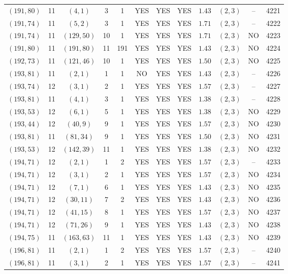 \begin{longtable}{|c|c|c|c|c|c|c|c|c|c|c|c|}
$(191,80)$ & 11 & $(4,1)$ & 3 & 1 & YES & YES & YES & $1.43$ & $(2,3)$ & -- & 4221\\
$(191,74)$ & 11 & $(5,2)$ & 3 & 1 & YES & YES & YES & $1.71$ & $(2,3)$ & -- & 4222\\
$(191,74)$ & 11 & $(129,50)$ & 10 & 1 & YES & YES & YES & $1.71$ & $(2,3)$ & NO & 4223\\
$(191,80)$ & 11 & $(191,80)$ & 11 & 191 & YES & YES & YES & $1.43$ & $(2,3)$ & NO & 4224\\
$(192,73)$ & 11 & $(121,46)$ & 10 & 1 & YES & YES & YES & $1.50$ & $(2,3)$ & NO & 4225\\
$(193,81)$ & 11 & $(2,1)$ & 1 & 1 & NO & YES & YES & $1.43$ & $(2,3)$ & -- & 4226\\
$(193,74)$ & 12 & $(3,1)$ & 2 & 1 & YES & YES & YES & $1.57$ & $(2,3)$ & -- & 4227\\
$(193,81)$ & 11 & $(4,1)$ & 3 & 1 & YES & YES & YES & $1.38$ & $(2,3)$ & -- & 4228\\
$(193,53)$ & 12 & $(6,1)$ & 5 & 1 & YES & YES & YES & $1.38$ & $(2,3)$ & NO & 4229\\
$(193,44)$ & 12 & $(40,9)$ & 9 & 1 & YES & YES & YES & $1.57$ & $(2,3)$ & NO & 4230\\
$(193,81)$ & 11 & $(81,34)$ & 9 & 1 & YES & YES & YES & $1.50$ & $(2,3)$ & NO & 4231\\
$(193,53)$ & 12 & $(142,39)$ & 11 & 1 & YES & YES & YES & $1.38$ & $(2,3)$ & NO & 4232\\
$(194,71)$ & 12 & $(2,1)$ & 1 & 2 & YES & YES & YES & $1.57$ & $(2,3)$ & -- & 4233\\
$(194,71)$ & 12 & $(3,1)$ & 2 & 1 & YES & YES & YES & $1.57$ & $(2,3)$ & NO & 4234\\
$(194,71)$ & 12 & $(7,1)$ & 6 & 1 & YES & YES & YES & $1.43$ & $(2,3)$ & NO & 4235\\
$(194,71)$ & 12 & $(30,11)$ & 7 & 2 & YES & YES & YES & $1.43$ & $(2,3)$ & NO & 4236\\
$(194,71)$ & 12 & $(41,15)$ & 8 & 1 & YES & YES & YES & $1.57$ & $(2,3)$ & NO & 4237\\
$(194,71)$ & 12 & $(71,26)$ & 9 & 1 & YES & YES & YES & $1.43$ & $(2,3)$ & NO & 4238\\
$(194,75)$ & 11 & $(163,63)$ & 11 & 1 & YES & YES & YES & $1.43$ & $(2,3)$ & NO & 4239\\
$(196,81)$ & 11 & $(2,1)$ & 1 & 2 & YES & YES & YES & $1.57$ & $(2,3)$ & -- & 4240\\
$(196,81)$ & 11 & $(3,1)$ & 2 & 1 & YES & YES & YES & $1.57$ & $(2,3)$ & -- & 4241\\

\end{longtable}
